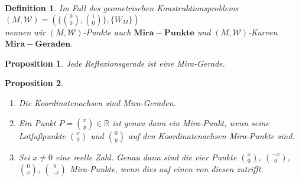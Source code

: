 \documentclass{scrbook}
\newtheorem{definition}{Definition}
\newtheorem{proposition}{Proposition}
\begin{document}
\begin{definition}
    Im Fall des geometrischen Konstruktionsproblems \\
    $ (M,\mathcal{W}) = (\{\binom{0}{0},\binom{1}{0} \}, \{ W_M\}) $ \\
    nennen wir $(M,\mathcal{W})$-Punkte auch $\mathbf{Mira-Punkte}$ und $(M,\mathcal{W})$-Kurven $\mathbf{Mira-Geraden}$.
\end{definition}

\begin{proposition}
    Jede Reflexionsgerade ist eine Mira-Gerade.
\end{proposition}
 
\begin{proposition}
    \label{Mira-Geraden-Beispiele}
    \begin{enumerate}[label=(\alph*)]
        \item Die Koordinatenachsen sind Mira-Geraden.
        \item Ein Punkt $P = \binom{x}{y} \in \mathbb{R}$ ist genau dann ein Mira-Punkt, wenn seine Lotfußpunkte $\binom{x}{0}$ und $\binom{0}{y}$ auf den Koordinatenachsen Mira-Punkte sind.
        \item Sei $x \neq 0$ eine reelle Zahl. Genau dann sind die vier Punkte $\binom{x}{0}$, $\binom{-x}{0}$, $\binom{0}{x}$, $\binom{0}{-x}$ Mira-Punkte, wenn dies auf einen von diesen zutrifft.
    \end{enumerate}
\end{proposition}
\end{document}
